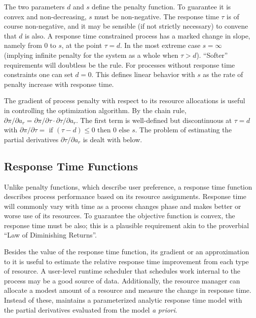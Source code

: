 The two parameters $d$ and $s$ define the penalty function.
To guarantee it is convex and non-decreasing, $s$ must be non-negative.
The response time $\tau$  is of course non-negative,
and it may be sensible (if not strictly necessary) to convene that $d$ is also.
A response time constrained process has a marked change in slope, namely from 0 to $s$, at the point $\tau= d$.
In the most extreme case $s = \infty$ (implying infinite penalty for the system as a whole when $\tau > d$).  ``Softer'' requirements will doubtless be the rule.
For processes without response time constraints one can set $d = 0$.
This defines linear behavior with $s$ as the rate of penalty increase with response time.

The gradient of process penalty with respect to its resource allocations is useful in controlling the optimization algorithm.
By the chain rule, $\partial\pi/\partial a_r = \partial\pi/\partial\tau\cdot\partial\tau/\partial a_r$.
The first term is well-defined but discontinuous at $\tau = d$ with
$\partial\pi/\partial\tau = \mbox{ if } (\tau - d) \leq 0 \mbox{ then } 0 \mbox{ else } s$.
The problem of estimating the partial derivatives $\partial\tau/\partial a_r$ is dealt with below.

\subsection*{Response Time Functions}

Unlike penalty functions, which describe user preference, a response time function describes process performance based on its resource assignments.
Response time will commonly vary with time as a process changes phase and makes better or worse use of its resources.
To guarantee the objective function is convex, the response time must be also;
this is a plausible requirement akin to the proverbial ``Law of Diminishing Returns''.

Besides the value of the response time function, its gradient or an approximation to it is useful to estimate the relative response time improvement from each type of resource.  A user-level runtime scheduler that schedules work internal to the process may be a good source of data.
Additionally, the resource manager can allocate a modest amount of a resource and measure the change in response time.
Instead of these, \pacora maintains a parameterized analytic response time model with the partial derivatives evaluated from the model \emph{a priori}.

